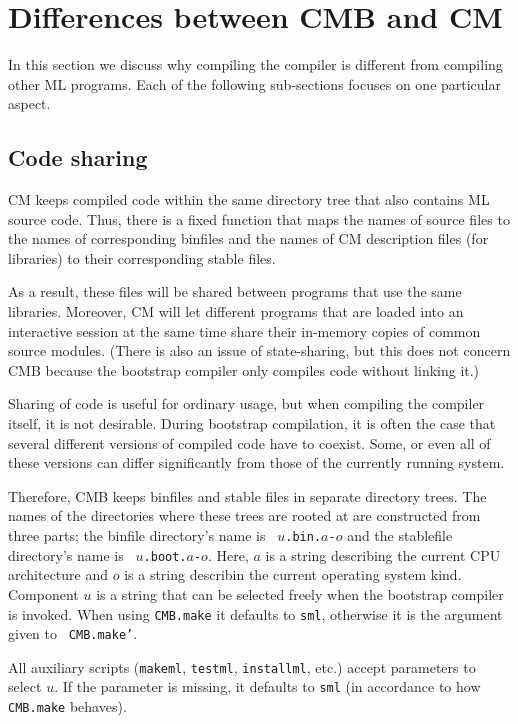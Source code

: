 
\section{Differences between CMB and CM}

In this section we discuss why compiling the compiler is different
from compiling other ML programs.  Each of the following sub-sections
focuses on one particular aspect.

\subsection{Code sharing}

CM keeps compiled code within the same directory tree that also
contains ML source code.  Thus, there is a fixed function that maps
the names of source files to the names of corresponding binfiles and
the names of CM description files (for libraries) to their
corresponding stable files.

As a result, these files will be shared between programs that use the
same libraries.  Moreover, CM will let different programs that are
loaded into an interactive session at the same time share their
in-memory copies of common source modules.  (There is also an issue of
state-sharing, but this does not concern CMB because the bootstrap
compiler only compiles code without linking it.)

Sharing of code is useful for ordinary usage, but when compiling the
compiler itself, it is not desirable.  During bootstrap compilation,
it is often the case that several different versions of compiled code
have to coexist.  Some, or even all of these versions can differ
significantly from those of the currently running system.

Therefore, CMB keeps binfiles and stable files in separate directory
trees.  The names of the directories where these trees are rooted at
are constructed from three parts; the binfile directory's name is {\tt
$u$.bin.$a$-$o$} and the stablefile directory's name is {\tt
$u$.boot.$a$-$o$}.  Here, $a$ is a string describing the current CPU
architecture and $o$ is a string describin the current operating
system kind. Component $u$ is a string that can be selected freely
when the bootstrap compiler is invoked.  When using {\tt CMB.make} it
defaults to {\tt sml}, otherwise it is the argument given to {\tt
CMB.make'}.

All auxiliary scripts ({\tt makeml}, {\tt testml}, {\tt installml},
etc.) accept parameters to select $u$.  If the parameter is missing,
it defaults to {\tt sml} (in accordance to how {\tt CMB.make}
behaves).

